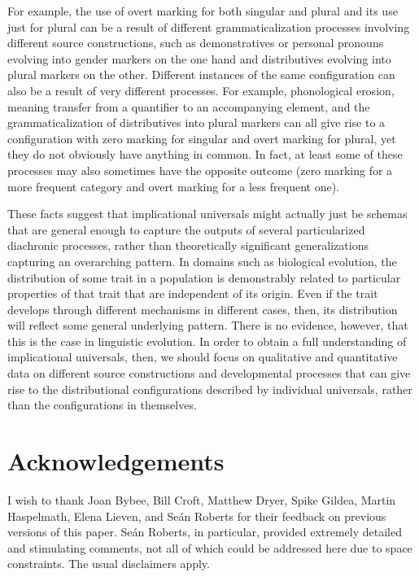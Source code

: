 \documentclass[output=paper]{langsci/langscibook}
\begin{document}
For example, the use of overt marking for both
singular and plural and its use just for plural can be a result of
different grammaticalization  processes involving different source
constructions, such as demonstratives or personal pronouns evolving
into gender  markers on the one hand and distributives evolving into
plural markers on the other. Different instances of
the same configuration can also be a result of very different processes. For
example, phonological erosion, meaning transfer from a
quantifier to an accompanying element, and the grammaticalization of
distributives into plural markers can all give rise to a configuration with
zero marking for singular and overt marking for plural, yet they do
not obviously have anything in common.  In fact, at least some of
these processes may also sometimes have the opposite outcome (zero marking for a more
frequent category and overt marking for a less frequent one).

These facts suggest that implicational universals might actually 
just be sche\-mas that are general enough to capture the outputs of
several particularized  diachronic 
processes, rather than theoretically significant generalizations
capturing an
overarching pattern. In domains such as biological evolution,  the distribution of
some trait in a population is demonstrably  related to
particular properties of that trait that are independent of its
origin. Even if the trait develops through
different mechanisms in different cases, then, its distribution will
reflect some general underlying pattern.  There is no evidence, however, that this is the case in
linguistic evolution.  In order to obtain a full understanding of
implicational universals, then, we should  focus on qualitative and
  quantitative data on different source constructions and developmental
  processes that can give rise to the distributional configurations described by individual
  universals, rather than  the configurations in themselves.

 
 \largerpage
\section*{Acknowledgements}
 I wish to thank Joan Bybee, Bill Croft,
Matthew Dryer, Spike Gildea, Martin Haspelmath, Elena Lieven, and
Seán Roberts for their feedback on previous versions of this
paper. Seán Roberts, in particular, provided extremely detailed and
stimulating comments, not all of which could be addressed here due to
space constraints. The usual disclaimers apply.
\end{document}

